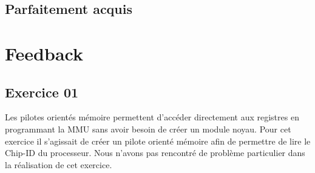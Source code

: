 \documentclass{ReportTemplate}
\begin{document}
\subsection{Parfaitement acquis}
\section{Feedback}
\subsection{Exercice 01}
Les pilotes orientés mémoire permettent d'accéder directement aux
registres en programmant la MMU sans avoir besoin de créer un module noyau.
Pour cet exercice il s'agissait de créer un pilote orienté mémoire afin de
permettre de lire le Chip-ID du processeur. Nous n'avons pas rencontré de
problème particulier dans la réalisation de cet exercice.
\end{document}
